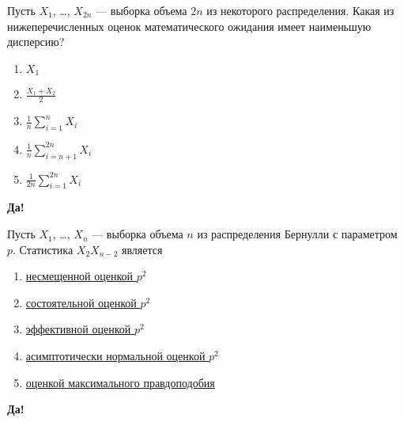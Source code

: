 \documentclass[t]{beamer}
\begin{document}
 \begin{frame} \label{36-Yes} 
\begin{block}{36} 

Пусть $X_1$, \ldots, $X_{2 n}$ — выборка объема $2 n$ из некоторого распределения. Какая из нижеперечисленных оценок математического ожидания имеет наименьшую дисперсию?
 


 \end{block} 
\begin{enumerate} 
\item[] \hyperlink{36-No}{\beamergotobutton{} $X_1$}
\item[] \hyperlink{36-No}{\beamergotobutton{} $\frac{X_1+X_2}{2}$}
\item[] \hyperlink{36-No}{\beamergotobutton{} $\frac{1}{n} \sum_{i=1}^n X_i$}
\item[] \hyperlink{36-No}{\beamergotobutton{} $\frac{1}{n} \sum_{i=n+1}^{2 n} X_i$}
\item[] \hyperlink{36-Yes}{\beamergotobutton{} $\frac{1}{2 n} \sum_{i=1}^{2 n} X_i$}
\end{enumerate} 

 \textbf{Да!} 
 \hyperlink{37}{}\end{frame} 


 \begin{frame} \label{37-Yes} 
\begin{block}{37} 

Пусть $X_1$, \ldots, $X_n$ — выборка объема $n$ из распределения Бернулли с параметром $p$. Статистика $X_2 X_{n-2}$ является
 


 \end{block} 
\begin{enumerate} 
\item[] \hyperlink{37-Yes}{\beamergotobutton{} несмещенной оценкой $p^2$}
\item[] \hyperlink{37-No}{\beamergotobutton{} состоятельной оценкой $p^2$}
\item[] \hyperlink{37-No}{\beamergotobutton{} эффективной оценкой $p^2$}
\item[] \hyperlink{37-No}{\beamergotobutton{} асимптотически нормальной оценкой $p^2$}
\item[] \hyperlink{37-No}{\beamergotobutton{} оценкой максимального правдоподобия}
\end{enumerate} 

 \textbf{Да!} 
 \hyperlink{38}{}\end{frame} 
\end{document}

